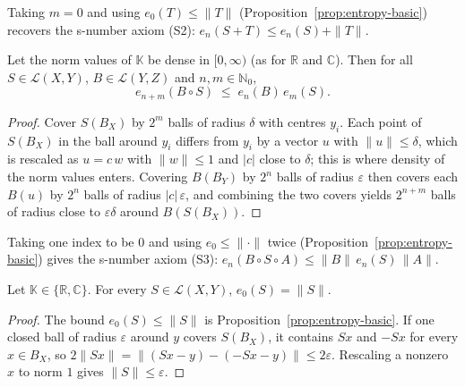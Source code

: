 Taking $m = 0$ and using $e_0(T) \le \|T\|$
(Proposition~\ref{prop:entropy-basic}) recovers the s-number axiom (S2):
$e_n(S + T) \le e_n(S) + \|T\|$.

\begin{theorem}
\label{thm:entropy-multiplicative}
\leanok
{}
Let the norm values of $\mathbb{K}$ be dense in $[0, \infty)$ (as for
$\mathbb{R}$ and $\mathbb{C}$). Then for all $S \in \mathcal{L}(X, Y)$,
$B \in \mathcal{L}(Y, Z)$ and $n, m \in \mathbb{N}_0$,
\[
  e_{n+m}(B \circ S) \;\le\; e_n(B)\, e_m(S) .
\]
\end{theorem}
\begin{proof}
\leanok
{}
Cover $S(B_X)$ by $2^m$ balls of radius $\delta$ with centres $y_i$. Each
point of $S(B_X)$ in the ball around $y_i$ differs from $y_i$ by a vector
$u$ with $\|u\| \le \delta$, which is rescaled as $u = c\,w$ with
$\|w\| \le 1$ and $|c|$ close to $\delta$; this is where density of
the norm values enters. Covering $B(B_Y)$ by $2^n$ balls of radius
$\varepsilon$ then covers each $B(u)$ by $2^n$ balls of radius
$|c|\,\varepsilon$, and combining the two covers yields $2^{n+m}$ balls
of radius close to $\varepsilon\delta$ around $B(S(B_X))$.
\end{proof}

Taking one index to be $0$ and using $e_0 \le \|\cdot\|$ twice
(Proposition~\ref{prop:entropy-basic}) gives the s-number axiom (S3):
$e_n(B \circ S \circ A) \le \|B\| \, e_n(S) \, \|A\|$.

\begin{proposition}
\label{prop:entropy-zero}
\leanok
{}
Let $\mathbb{K} \in \{\mathbb{R}, \mathbb{C}\}$. For every
$S \in \mathcal{L}(X, Y)$, $e_0(S) = \|S\|$.
\end{proposition}
\begin{proof}
\leanok
{}
The bound $e_0(S) \le \|S\|$ is Proposition~\ref{prop:entropy-basic}. If one
closed ball of radius $\varepsilon$ around $y$ covers $S(B_X)$, it contains $Sx$
and $-Sx$ for every $x \in B_X$, so
$2\|Sx\| = \|(Sx - y) - (-Sx - y)\| \le 2\varepsilon$. Rescaling a nonzero $x$
to norm $1$ gives $\|S\| \le \varepsilon$.
\end{proof}

